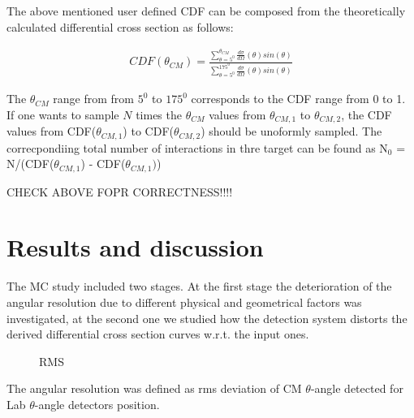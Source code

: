 \documentclass[%
 aip,
cp,  %
 amsmath,amssymb,%
 reprint,%
]{revtex4-2}
\begin{document}
The above mentioned user defined CDF can be composed from the theoretically calculated differential cross section as follows:

\begin{eqnarray}
 CDF(\theta_{CM}) = \frac{ \sum\limits_{\theta=5^0}^{\theta_{CM}} \frac{d\sigma}{d\Omega}(\theta) sin(\theta)} { \sum\limits_{\theta=5^0}^{175^0} \frac{d\sigma}{d\Omega}(\theta) sin(\theta)}
\end{eqnarray}

The $\theta_{CM}$ range from from $5 ^0$ to $175 ^0$ corresponds to the CDF range from 0 to 1.  If one wants to sample $N$ times the $\theta_{CM}$ values from $\theta_{CM, 1}$ to $\theta_{CM, 2}$, the CDF values from CDF($\theta_{CM, 1}$) to CDF($\theta_{CM, 2}$) should be unoformly sampled.  The correcpondiing total  number of interactions in thre target can be found as N$_0$ = N/(CDF($\theta_{CM, 1}$) - CDF($\theta_{CM, 1})$)

 CHECK ABOVE FOPR CORRECTNESS!!!!


\section{Results and discussion}

The MC study included two stages. At the first stage the deterioration of the angular resolution due to different physical and geometrical factors  was investigated, at the second one we studied how the detection system distorts the derived differential cross section curves w.r.t. the input ones.

\begin{figure}[h]
\caption{RMS}
\label{ris:fig1}
\end{figure}

The angular resolution was defined as rms deviation of CM $\theta$-angle detected for Lab $\theta$-angle detectors position.
\end{document}
